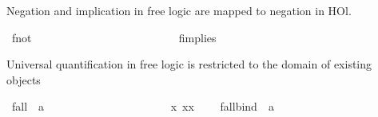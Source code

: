 \begin{isabellebody}
\begin{isamarkuptext}%
Negation and implication in free logic are mapped to negation in HOl.%
\end{isamarkuptext}%
\isamarkuptrue%
\isamarkupfalse%
\ f{\isacharunderscore}not\ {\isacharcolon}{\isacharcolon}\ {\isachardoublequoteopen}{\isasymsigma}{\isasymRightarrow}{\isasymsigma}{\isachardoublequoteclose}\ {\isacharparenleft}{\isachardoublequoteopen}\isactrlbold {\isasymnot}{\isacharunderscore}{\isachardoublequoteclose}\ {\isacharbrackleft}{}{}{\isacharbrackright}\ {}{}{\isacharparenright}\ \ \ \ \ \ \ \ \ \ \isanewline
\ \ {\isachardoublequoteopen}\isactrlbold {\isasymnot}{\isasymphi}\ {\isasymequiv}\ {\isasymnot}{\isasymphi}{\isachardoublequoteclose}\ \ \ \ \ \isanewline
{}\isamarkupfalse%
\ f{\isacharunderscore}implies\ {\isacharcolon}{\isacharcolon}\ {\isachardoublequoteopen}{\isasymsigma}{\isasymRightarrow}{\isasymsigma}{\isasymRightarrow}{\isasymsigma}{\isachardoublequoteclose}\ {\isacharparenleft}\ {\isachardoublequoteopen}\isactrlbold {\isasymrightarrow}{\isachardoublequoteclose}\ {}{}{\isacharparenright}\ \ \ \isanewline
\ \ {\isachardoublequoteopen}{\isasymphi}\isactrlbold {\isasymrightarrow}{\isasympsi}\ {\isasymequiv}\ {\isasymphi}{\isasymlongrightarrow}{\isasympsi}{\isachardoublequoteclose}%
\begin{isamarkuptext}%
Universal quantification in free logic is restricted to the domain of existing objects%
\end{isamarkuptext}%
\isamarkuptrue%
\isamarkupfalse%
\ f{\isacharunderscore}all\ {\isacharcolon}{\isacharcolon}\ {\isachardoublequoteopen}{\isacharparenleft}{\isacharprime}a{\isasymRightarrow}{\isasymsigma}{\isacharparenright}{\isasymRightarrow}{\isasymsigma}{\isachardoublequoteclose}\ {\isacharparenleft}{\isachardoublequoteopen}\isactrlbold {\isasymforall}{\isachardoublequoteclose}{\isacharparenright}\ \ \ \ \ \ \ \ \ \ \ \ \ \ \ \ \ \isanewline
\ \ {\isachardoublequoteopen}\isactrlbold {\isasymforall}{\isasymPhi}\ {\isasymequiv}\ {\isasymforall}x{\isachardot}\ {\isasymA}{\isacharparenleft}x{\isacharparenright}{\isasymlongrightarrow}{\isasymPhi}{\isacharparenleft}x{\isacharparenright}{\isachardoublequoteclose}\ \ \ \isanewline
{}\isamarkupfalse%
\ f{\isacharunderscore}all{\isacharunderscore}bind\ {\isacharcolon}{\isacharcolon}\ {\isachardoublequoteopen}{\isacharparenleft}{\isacharprime}a{\isasymRightarrow}{\isasymsigma}{\isacharparenright}{\isasymRightarrow}{\isasymsigma}{\isachardoublequoteclose}\ {\isacharparenleft}\ {\isachardoublequoteopen}\isactrlbold {\isasymforall}{\isachardoublequoteclose}\ {\isacharbrackleft}{}{\isacharbrackright}\ {}{\isacharparenright}\ \isanewline

\end{isabellebody}
